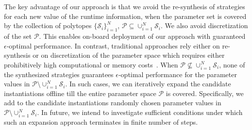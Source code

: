 The key advantage of our approach is that we avoid the re-synthesis of strategies for each new value of the runtime information, when the parameter set is covered by the collection of polytopes ${\{\mathcal{S}_i\}}_{i=1}^N$,  $\mathcal{P}\subseteq\cup_{i=1}^N \mathcal{S}_i$.  We also avoid discretization of the set $\mathcal{P}$. This enables on-board deployment of our approach with guaranteed $\epsilon$-optimal performance. In contrast, traditional approaches rely either on re-synthesis or on discretization of the parameter space which requires either prohibitively high computational or memory costs~\cite{jangcontinuous,smith2011optimal}. When $\mathcal{P}\not\subseteq\cup_{i=1}^N \mathcal{S}_i$, none of the synthesized strategies guarantees $\epsilon$-optimal performance for the parameter values in $\mathcal{P}\setminus\cup_{i=1}^N \mathcal{S}_i$. In such cases, we can iteratively expand the candidate instantiations offline till the entire parameter space $\mathcal{P}$ is covered. Specifically, we add to the candidate instantiations randomly chosen parameter values in $\mathcal{P}\setminus\cup_{i=1}^N \mathcal{S}_i$. In future, we intend to investigate sufficient conditions under which such an expansion approach terminates in finite number of steps.








